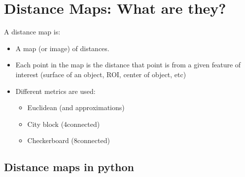 \documentclass[letterpaper,10pt,english]{sphinxmanual}
\begin{document}
\chapter{Distance Maps: What are they?}
\label{\detokenize{06-AdvancedShapeAndTexture:distance-maps-what-are-they}}
\sphinxAtStartPar
A distance map is:
\begin{itemize}
\item {} 
\sphinxAtStartPar
A map (or image) of distances.

\item {} 
\sphinxAtStartPar
Each point in the map is the distance that point is from a given feature of interest (surface of an object, ROI, center of object, etc)

\item {} 
\sphinxAtStartPar
Different metrics are used:
\begin{itemize}
\item {} 
\sphinxAtStartPar
Euclidean (and approximations)

\item {} 
\sphinxAtStartPar
City block (4\sphinxhyphen{}connected)

\item {} 
\sphinxAtStartPar
Checkerboard (8\sphinxhyphen{}connected)

\end{itemize}

\end{itemize}


\section{Distance maps in python}
\label{\detokenize{06-AdvancedShapeAndTexture:distance-maps-in-python}}
\begin{sphinxVerbatim}[commandchars=\\\{\}]
\end{sphinxVerbatim}
\end{document}
